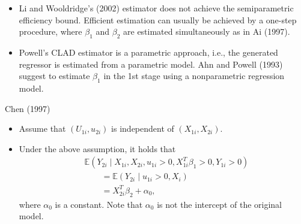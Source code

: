 \documentclass[xcolor=svgnames,dvipdfmx,cjk]{beamer}
\theoremstyle{example}
\def\E{\mathbb{E}}
\begin{document}
\begin{frame}
      \begin{itemize}
            \item Li and Wooldridge's (2002) estimator does not achieve the semiparametric efficiency bound.
                  Efficient estimation can usually be achieved by a one-step procedure, 
                  where $\beta_1$ and $\beta_2$ are estimated simultaneously as in Ai (1997).
            \item Powell's CLAD estimator is a parametric approach, i.e., 
                  the generated regressor is estimated from a parametric model.
                  Ahn and Powell (1993) suggest to estimate $\beta_1$ in the 1st stage using a nonparametric regression model.
      \end{itemize}
\end{frame}


\begin{frame}{Chen (1997)}
      \begin{itemize}
            \item Assume that $(U_{1i}, u_{2i})$ is independent of $(X_{1i}, X_{2i})$.
            \item Under the above assumption, it holds that
                  \begin{align*}
                        &\E(Y_{2i} \mid X_{1i}, X_{2i}, u_{1i}>0, X_{1i}^T\beta_1>0, Y_{1i}>0) \\
                        &\qquad= \E(Y_{2i} \mid u_{1i}>0, X_i) \\
                        &\qquad= X_{2i}^T \beta_2 + \alpha_0,
                  \end{align*}
                  where $\alpha_0$ is a constant. 
                  Note that $\alpha_0$ is not the intercept of the original model.
            
      \end{itemize}
\end{frame}
\end{document}
